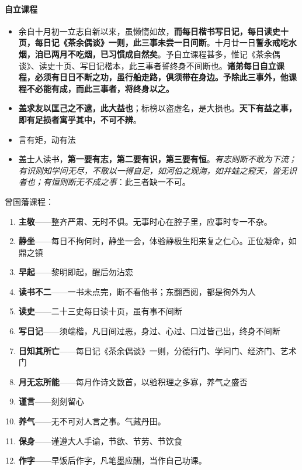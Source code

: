 \documentclass[UTF8,a4paper,8pt]{ctexbook}
\begin{document}
	\paragraph{自立课程}
		\begin{itemize}
			\item 余自十月初一立志自新以来，虽懒惰如故，\textbf{而每日楷书写日记，每日读史十页，每日记《茶余偶谈》一则，此三事未尝一日间断}。十月廿一日\textbf{誓永戒吃水烟，洎已两月不吃烟，已习惯成自然矣}。予自立课程甚多，惟记《茶余偶谈》、读史十页、写日记楷本，此三事者誓终身不间断也。\textbf{诸弟每日自立课程，必须有日日不断之功，虽行船走路，俱须带在身边。予除此三事外，他课程不必能有成，而此三事者，将终身以之。}
			
			\item \textbf{盖求友以匡己之不逮，此大益也}；标榜以盗虚名，是大损也。\textbf{天下有益之事，即有足损者寓乎其中，不可不辨}。
			\item 言有矩，动有法
			
			\item 盖士人读书，\textbf{第一要有志，第二要有识，第三要有恒}。\textit{有志则断不敢为下流；有识则知学问无尽，不敢以一得自足，如河伯之观海，如井蛙之窥天，皆无识者也；有恒则断无不成之事}：此三者缺一不可。
		\end{itemize}
		曾国藩课程：
		\begin{enumerate}
			\item \textbf{主敬}——整齐严肃、无时不俱。无事时心在腔子里，应事时专一不杂。
			\item \textbf{静坐}——每日不拘何时，静坐一会，体验静极生阳来复之仁心。正位凝命，如鼎之镇
			\item \textbf{早起}——黎明即起，醒后勿沾恋
			\item \textbf{读书不二}——一书未点完，断不看他书；东翻西阅，都是徇外为人
			\item \textbf{读史}——二十三史每日读十页，虽有事不间断
			\item \textbf{写日记}——须端楷，凡日间过恶，身过、心过、口过皆己出，终身不间断
			\item \textbf{日知其所亡}——每日记《茶余偶谈》一则，分德行门、学问门、经济门、艺术门
			\item \textbf{月无忘所能}——每月作诗文数首，以验积理之多寡，养气之盛否
			\item \textbf{谨言}——刻刻留心
			\item \textbf{养气}——无不可对人言之事。气藏丹田。
			\item \textbf{保身}——谨遵大人手谕，节欲、节劳、节饮食
			\item \textbf{作字}——早饭后作字，凡笔墨应酬，当作自己功课。
		\end{enumerate}
		
\end{document}
